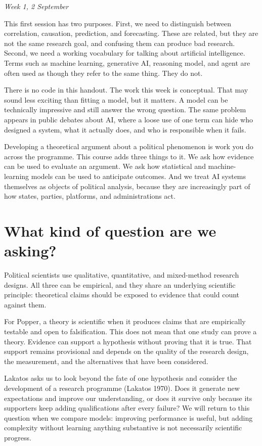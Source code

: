\documentclass[
  a4paper,
]{scrbook}
\begin{document}
\emph{Week 1, 2 September}

This first session has two purposes. First, we need to distinguish
between correlation, causation, prediction, and forecasting. These are
related, but they are not the same research goal, and confusing them can
produce bad research. Second, we need a working vocabulary for talking
about artificial intelligence. Terms such as machine learning,
generative AI, reasoning model, and agent are often used as though they
refer to the same thing. They do not.

There is no code in this handout. The work this week is conceptual. That
may sound less exciting than fitting a model, but it matters. A model
can be technically impressive and still answer the wrong question. The
same problem appears in public debates about AI, where a loose use of
one term can hide who designed a system, what it actually does, and who
is responsible when it fails.

Developing a theoretical argument about a political phenomenon is work
you do across the programme. This course adds three things to it. We ask
how evidence can be used to evaluate an argument. We ask how statistical
and machine-learning models can be used to anticipate outcomes. And we
treat AI systems themselves as objects of political analysis, because
they are increasingly part of how states, parties, platforms, and
administrations act.

\section{What kind of question are we
asking?}\label{what-kind-of-question-are-we-asking}

Political scientists use qualitative, quantitative, and mixed-method
research designs. All three can be empirical, and they share an
underlying scientific principle: theoretical claims should be exposed to
evidence that could count against them.

For Popper, a theory is scientific when it produces claims that are
empirically testable and open to falsification. This does not mean that
one study can prove a theory. Evidence can support a hypothesis without
proving that it is true. That support remains provisional and depends on
the quality of the research design, the measurement, and the
alternatives that have been considered.

Lakatos asks us to look beyond the fate of one hypothesis and consider
the development of a research programme (Lakatos 1970). Does it generate
new expectations and improve our understanding, or does it survive only
because its supporters keep adding qualifications after every failure?
We will return to this question when we compare models: improving
performance is useful, but adding complexity without learning anything
substantive is not necessarily scientific progress.
\end{document}
